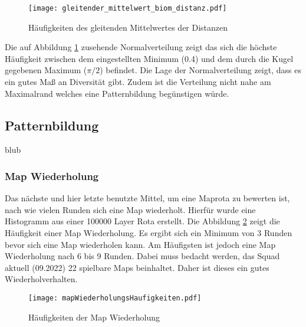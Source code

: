            \begin{figure}[htbp]
                \centering
                \texttt{[image: gleitender\_mittelwert\_biom\_distanz.pdf]}
                \caption{Häufigkeiten des gleitenden Mittelwertes der Distanzen}
                \label{fig:haufigkeit_gleitender_mittelwert}
            \end{figure}
            
            Die auf Abbildung \ref{fig:haufigkeit_gleitender_mittelwert} zusehende Normalverteilung zeigt das sich die höchste 
            Häufigkeit zwischen dem eingestellten Minimum (0.4) und dem durch die Kugel gegebenen Maximum ($\pi/2$) befindet.
            Die Lage der Normalverteilung zeigt, dass es ein gutes Maß an Diversität gibt. Zudem ist die
            Verteilung nicht nahe am Maximalrand welches eine Patternbildung begünstigen würde.


        \subsection{Patternbildung}
            blub 

        \subsubsection{Map Wiederholung}
            Das nächste und hier letzte benutzte Mittel, um eine Maprota zu bewerten ist, nach wie vielen Runden sich eine Map
            wiederholt. Hierfür wurde eine Histogramm aus einer 100000 Layer Rota erstellt.
            Die Abbildung \ref{fig:haufigkeit_der_map_wiederholung} zeigt die Häufigkeit einer Map Wiederholung. Es ergibt sich ein
            Minimum von 3 Runden bevor sich eine Map wiederholen kann. Am Häufigsten ist jedoch eine Map Wiederholung nach 6 bis 9 Runden.
            Dabei muss bedacht werden, das Squad aktuell (09.2022) 22 spielbare Maps beinhaltet. Daher ist dieses ein gutes Wiederholverhalten.

            \begin{figure}[htbp]
                \centering
                \texttt{[image: mapWiederholungsHaufigkeiten.pdf]}
                \caption{Häufigkeiten der Map Wiederholung}
                \label{fig:haufigkeit_der_map_wiederholung}
            \end{figure}

